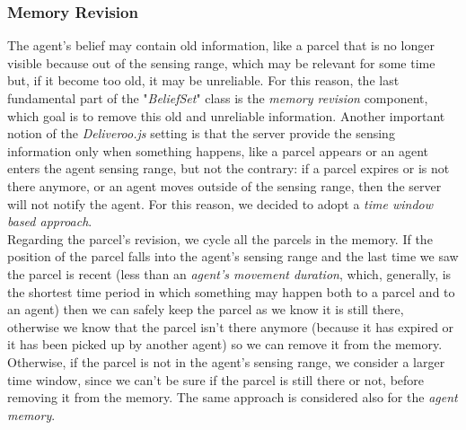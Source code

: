         \subsubsection{Memory Revision}\label{memoryRevision}
            The agent's belief may contain old information, like a parcel that is no longer visible because out of the sensing range, which may be relevant for some time but, if it become too old, it may be unreliable. For this reason, the last fundamental part of the "\textit{BeliefSet}" class is the \textit{memory revision} component, which goal is to remove this old and unreliable information. Another important notion of the \textit{Deliveroo.js} setting is that the server provide the sensing information only when something happens, like a parcel appears or an agent enters the agent sensing range, but not the contrary: if a parcel expires or is not there anymore, or an agent moves outside of the sensing range, then the server will not notify the agent. For this reason, we decided to adopt a \textit{time window based approach}.
            \medskip\\
            Regarding the parcel's revision, we cycle all the parcels in the memory. If the position of the parcel falls into the agent's sensing range and the last time we saw the parcel is recent (less than an \textit{agent's movement duration}, which, generally, is the shortest time period in which something may happen both to a parcel and to an agent) then we can safely keep the parcel as we know it is still there, otherwise we know that the parcel isn't there anymore (because it has expired or it has been picked up by another agent) so we can remove it from the memory. Otherwise, if the parcel is not in the agent's sensing range, we consider a larger time window, since we can't be sure if the parcel is still there or not, before removing it from the memory. The same approach is considered also for the \textit{agent memory}.

